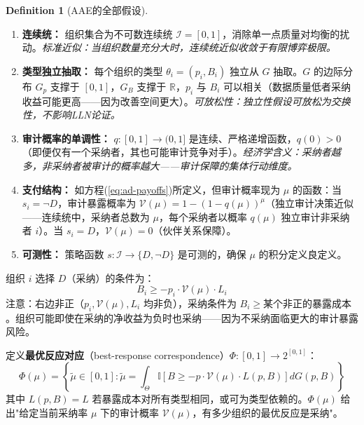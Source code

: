 \documentclass[12pt,a4paper]{ctexart}
\theoremstyle{definition}
\newtheorem{definition}{Definition}[section]
\theoremstyle{remark}
\begin{document}
\begin{definition}[AAE的全部假设]
\label{def:aae-assumptions}
\begin{enumerate}[label=\textbf{E\arabic*}, leftmargin=*, itemsep=4pt]
\item \textbf{连续统：} 组织集合为不可数连续统 $\mathcal{I} = [0,1]$，消除单一点质量对均衡的扰动。\hfill\textit{标准近似：当组织数量充分大时，连续统近似收敛于有限博弈极限。}

\item \textbf{类型独立抽取：} 每个组织的类型 $\theta_i = (p_i, B_i)$ 独立从 $G$ 抽取。$G$ 的边际分布 $G_p$ 支撑于 $[0,1]$，$G_B$ 支撑于 $\mathbb{R}$，$p_i$ 与 $B_i$ 可以相关（数据质量低者采纳收益可能更高——因为改善空间更大）。\hfill\textit{可放松性：独立性假设可放松为交换性，不影响LLN论证。}

\item \textbf{审计概率的单调性：} $q: [0,1] \to (0, 1]$ 是连续、严格递增函数，$q(0) > 0$（即便仅有一个采纳者，其也可能审计竞争对手）。\hfill\textit{经济学含义：采纳者越多，非采纳者被审计的概率越大——审计保障的集体行动维度。}

\item \textbf{支付结构：} 如方程(\ref{eq:ad-payoffs})所定义，但审计概率现为 $\mu$ 的函数：当 $s_i = \neg D$，审计暴露概率为 $\mathcal{V}(\mu) = 1 - (1 - q(\mu))^{\mu}$（独立审计决策近似——连续统中，采纳者总数为 $\mu$，每个采纳者以概率 $q(\mu)$ 独立审计非采纳者 $i$）。当 $s_i = D$，$\mathcal{V}(\mu) = 0$（伙伴关系保障）。

\item \textbf{可测性：} 策略函数 $s: \mathcal{I} \to \{D, \neg D\}$ 是可测的，确保 $\mu$ 的积分定义良定义。
\end{enumerate}
\end{definition}

组织 $i$ 选择 $D$（采纳）的条件为：
\begin{equation}
B_i \geq -p_i \cdot \mathcal{V}(\mu) \cdot L_i
\label{eq:adopt-condition}
\end{equation}
注意：右边非正（$p_i, \mathcal{V}(\mu), L_i$ 均非负），采纳条件为 $B_i \geq \text{某个非正的暴露成本}$。组织可能即使在采纳的净收益为负时也采纳——因为不采纳面临更大的审计暴露风险。

定义\textbf{最优反应对应}（best-response correspondence）$\Phi: [0,1] \to 2^{[0,1]}$：
\begin{equation}
\Phi(\mu) = \left\{ \tilde{\mu} \in [0,1] : \tilde{\mu} = \int_{\Theta} \mathbb{I}\left[B \geq -p \cdot \mathcal{V}(\mu) \cdot L(p, B)\right] dG(p, B) \right\}
\label{eq:br-correspondence}
\end{equation}
其中 $L(p, B) = L$ 若暴露成本对所有类型相同，或可为类型依赖的。$\Phi(\mu)$ 给出"给定当前采纳率 $\mu$ 下的审计概率 $\mathcal{V}(\mu)$，有多少组织的最优反应是采纳"。
\end{document}
